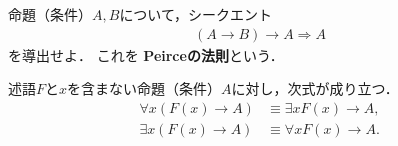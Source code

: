    \begin{que} \label{que:Peirce}
     命題（条件）$A,  B$について，シークエント
     \begin{align}
       (A \to B) \to A \Longrightarrow A
       \label{eq:Peircelaw}
     \end{align}
     を導出せよ．
     これを
     \textbf{Peirceの法則}という．
   \end{que}

   \begin{thm} \label{thm:genteito}
     述語$F$と$x$を含まない命題（条件）$A$に対し，次式が成り立つ．
     \begin{align}
       \forall x ( F(x) \to A ) & \equiv \exists x F(x) \to A, 
       \label{eq:foralltoA} \\
       \exists x ( F(x) \to A ) & \equiv \forall x F(x) \to A.
       \label{eq:existstoA}
     \end{align}
   \end{thm}
